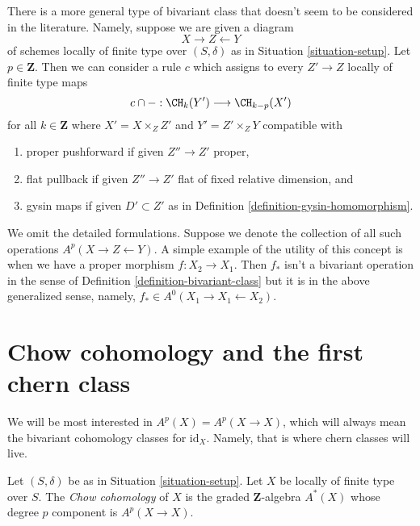 \begin{remark}
\label{remark-more-general-bivariant}
There is a more general type of bivariant class that doesn't seem to be
considered in the literature. Namely, suppose we are given a diagram
$$
X \longrightarrow Z \longleftarrow Y
$$
of schemes locally of finite type over $(S, \delta)$ as in
Situation \ref{situation-setup}. Let $p \in \mathbf{Z}$.
Then we can consider a rule $c$ which assigns to every $Z' \to Z$
locally of finite type maps
$$
c \cap - : \CH_k(Y') \longrightarrow \CH_{k - p}(X')
$$
for all $k \in \mathbf{Z}$
where $X' = X \times_Z Z'$ and $Y' = Z' \times_Z Y$ compatible with
\begin{enumerate}
\item proper pushforward if given $Z'' \to Z'$ proper,
\item flat pullback if given $Z'' \to Z'$ flat
of fixed relative dimension, and
\item gysin maps if given $D' \subset Z'$ as in
Definition \ref{definition-gysin-homomorphism}.
\end{enumerate}
We omit the detailed formulations. Suppose we denote the collection
of all such operations $A^p(X \to Z \leftarrow Y)$. A simple example
of the utility of this concept is when we have a proper morphism
$f : X_2 \to X_1$. Then $f_*$ isn't a bivariant operation in the sense of
Definition \ref{definition-bivariant-class} but it is in the
above generalized sense, namely, $f_* \in A^0(X_1 \to X_1 \leftarrow X_2)$.
\end{remark}





\section{Chow cohomology and the first chern class}
\label{section-chow-cohomology}

\noindent
We will be most interested in $A^p(X) = A^p(X \to X)$, which will always mean
the bivariant cohomology classes for $\text{id}_X$. Namely, that is where
chern classes will live.

\begin{definition}
\label{definition-chow-cohomology}
Let $(S, \delta)$ be as in Situation \ref{situation-setup}.
Let $X$ be locally of finite type over $S$. The {\it Chow cohomology}
of $X$ is the graded $\mathbf{Z}$-algebra $A^*(X)$ whose degree
$p$ component is $A^p(X \to X)$.
\end{definition}

